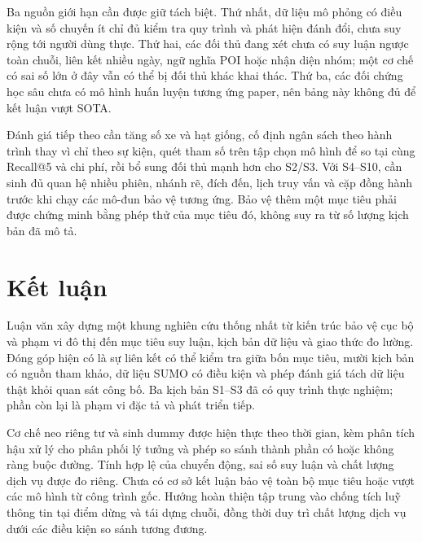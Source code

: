 Ba nguồn giới hạn cần được giữ tách biệt. Thứ nhất, dữ liệu mô phỏng có điều kiện và số chuyến ít chỉ đủ kiểm tra quy trình và phát hiện đánh đổi, chưa suy rộng tới người dùng thực. Thứ hai, các đối thủ đang xét chưa có suy luận ngược toàn chuỗi, liên kết nhiều ngày, ngữ nghĩa POI hoặc nhận diện nhóm; một cơ chế có sai số lớn ở đây vẫn có thể bị đối thủ khác khai thác. Thứ ba, các đối chứng học sâu chưa có mô hình huấn luyện tương ứng paper, nên bảng này không đủ để kết luận vượt SOTA.

Đánh giá tiếp theo cần tăng số xe và hạt giống, cố định ngân sách theo hành trình thay vì chỉ theo sự kiện, quét tham số trên tập chọn mô hình để so tại cùng Recall@5 và chi phí, rồi bổ sung đối thủ mạnh hơn cho S2/S3. Với S4--S10, cần sinh đủ quan hệ nhiều phiên, nhánh rẽ, đích đến, lịch truy vấn và cặp đồng hành trước khi chạy các mô-đun bảo vệ tương ứng. Bảo vệ thêm một mục tiêu phải được chứng minh bằng phép thử của mục tiêu đó, không suy ra từ số lượng kịch bản đã mô tả.

\chapter{Kết luận}

Luận văn xây dựng một khung nghiên cứu thống nhất từ kiến trúc bảo vệ cục bộ và phạm vi đô thị đến mục tiêu suy luận, kịch bản dữ liệu và giao thức đo lường. Đóng góp hiện có là sự liên kết có thể kiểm tra giữa bốn mục tiêu, mười kịch bản có nguồn tham khảo, dữ liệu SUMO có điều kiện và phép đánh giá tách dữ liệu thật khỏi quan sát công bố. Ba kịch bản S1--S3 đã có quy trình thực nghiệm; phần còn lại là phạm vi đặc tả và phát triển tiếp.

Cơ chế neo riêng tư và sinh dummy được hiện thực theo thời gian, kèm phân tích hậu xử lý cho phân phối lý tưởng và phép so sánh thành phần có hoặc không ràng buộc đường. Tính hợp lệ của chuyển động, sai số suy luận và chất lượng dịch vụ được đo riêng. Chưa có cơ sở kết luận bảo vệ toàn bộ mục tiêu hoặc vượt các mô hình từ công trình gốc. Hướng hoàn thiện tập trung vào chống tích luỹ thông tin tại điểm dừng và tái dựng chuỗi, đồng thời duy trì chất lượng dịch vụ dưới các điều kiện so sánh tương đương.
